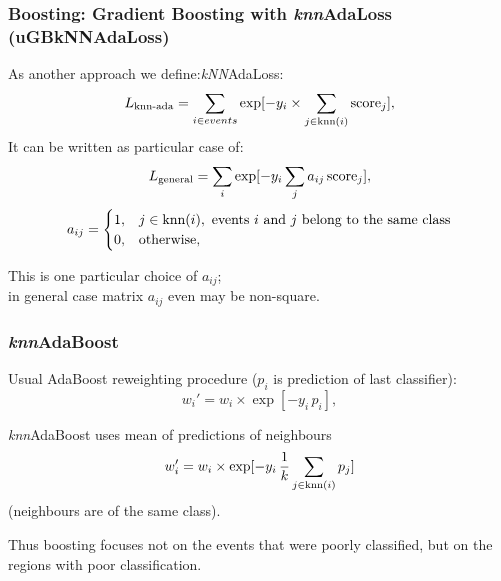 \documentclass{beamer}
\begin{document}
\begin{frame}[t]
    \frametitle{Boosting: Gradient Boosting with \textit{knn}AdaLoss (uGBkNNAdaLoss) }
    As another approach we define:\textit{kNN}AdaLoss:
    \[
        L_\text{knn-ada} = \sum_{i \in events} \exp[-y_i \times \sum_{j \in \text{knn}(i)} \text{score}_j],
    \]
    It can be written as particular case of:
    \[
        L_\text{general} = \sum_i \exp [- y_i \sum_j a_{ij} \, \text{score}_j ],
    \]
    \[
        a_{ij} = 
        \begin{cases} 
            1, & j \in \text{knn}(i), \text{ events $i$ and $j$ belong to the same class} \\
            0, & \text{otherwise},
        \end{cases}
    \]

    This is one particular choice of $a_{ij}$; \\
    in general case matrix $a_{ij}$ even may be non-square.

\end{frame}

\begin{frame}[t]
    \frametitle{\textit{knn}AdaBoost}
    Usual AdaBoost reweighting procedure ($p_i$ is prediction of last classifier):
    \[
        w_i' = w_i \times \exp[-y_i \, p_i],
    \]

    \textit{knn}AdaBoost uses mean of predictions of neighbours 
    \[
        w_i' = w_i \times \exp[-y_i \, \dfrac{1}{k} \sum_{j \in \text{knn}(i)} p_j]
    \]
    (neighbours are of the same class).

    Thus boosting focuses not on the events that were poorly classified, but on the regions with poor classification.
\end{frame}



\end{document}
